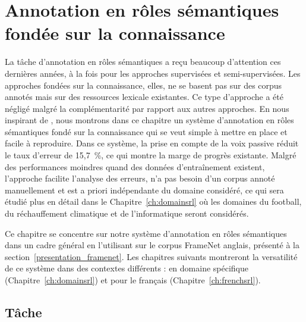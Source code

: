 \chapter{Annotation en rôles sémantiques fondée sur la connaissance}
\label{ch:srl}




La tâche d'annotation en rôles sémantiques a reçu beaucoup d'attention ces
dernières années, à la fois pour les approches supervisées et semi-supervisées.
Les approches fondées sur la connaissance, elles, ne se basent pas sur des
corpus annotés mais sur des ressources lexicale existantes. Ce type d'approche
a été négligé malgré la complémentarité par rapport aux autres approches. En
nous inspirant de \citep{swier2004unsupervised,swier2005exploiting}, nous
montrons dans ce chapitre un système d'annotation en rôles sémantiques fondé
sur la connaissance qui se veut simple à mettre en place et facile à
reproduire. Dans ce système, la prise en compte de la voix passive réduit le
taux d'erreur de 15,7~\%, ce qui montre la marge de progrès existante. Malgré
des performances moindres quand des données d'entraînement existent, l'approche
facilite l'analyse des erreurs, n'a pas besoin d'un corpus annoté manuellement
et est a priori indépendante du domaine considéré, ce qui sera étudié plus en
détail dans le Chapitre~\ref{ch:domainsrl} où les domaines du football, du
réchauffement climatique et de l'informatique seront considérés.

Ce chapitre se concentre sur notre système d'annotation en rôles sémantiques
dans un cadre général en l'utilisant sur le corpus FrameNet anglais, présenté à
la section~\ref{presentation_framenet}. Les chapitres suivants montreront la
versatilité de ce système dans des contextes différents : en domaine spécifique
(Chapitre~\ref{ch:domainsrl}) et pour le français
(Chapitre~\ref{ch:frenchsrl}).

\section{Tâche}

